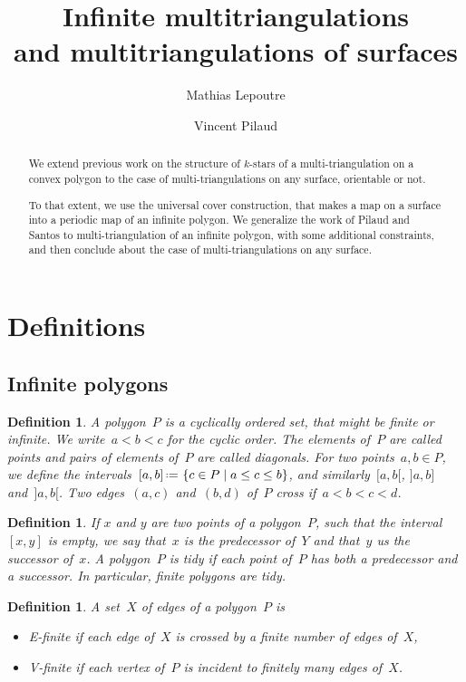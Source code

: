 \documentclass{amsart}
\title[Infinite multitriangulations and multitriangulations of surfaces]{Infinite multitriangulations \\ and multitriangulations of surfaces}
\author{Mathias Lepoutre}
\author{Vincent Pilaud}
\newtheorem{definition}[theorem]{Definition}
\theoremstyle{remark}
\newcommand{\darkblue}{\color{darkblue}} %
\newcommand{\defn}[1]{\textsl{\darkblue #1}} %
\newcommand*{\nbd}[0]{neighbourhood\xspace}
\newcommand*{\ef}[0]{E-finite\xspace}
\newcommand*{\vf}[0]{V-finite\xspace}
\newcommand{\set}[2]{\left\{ #1 \;\middle|\; #2 \right\}} %
\newcommand{\eqdef}{\mbox{\,\raisebox{0.2ex}{\scriptsize\ensuremath{\mathrm:}}\ensuremath{=}\,}} %
\begin{document}
\begin{abstract}
We extend previous work on the structure of $k$-stars of a multi-triangulation on a convex polygon to the case of multi-triangulations on any surface, orientable or not. 

To that extent, we use the universal cover construction, that makes a map on a surface into a periodic map of an infinite polygon. We generalize the work of Pilaud and Santos to multi-triangulation of an infinite polygon, with some additional constraints, and then conclude about the case of multi-triangulations on any surface.
\end{abstract}

\maketitle

\section{Definitions}

\subsection{Infinite polygons}

\begin{definition}%
A \defn{polygon}~$P$ is a cyclically ordered set, that might be finite or infinite.
We write~$a < b < c$ for the cyclic order.
The elements of~$P$ are called \defn{points} and pairs of elements of~$P$ are called \defn{diagonals}.
For two points~$a,b \in P$, we define the intervals~$[a,b] \eqdef \set{c \in P}{a \le c \le b}$, and similarly~$[a,b[$, $]a,b]$ and~$]a,b[$.
Two edges~$(a,c)$ and~$(b,d)$ of~$P$ \defn{cross} if~$a < b < c < d$.
\end{definition}

\begin{definition}%
If $x$ and $y$ are two points of a polygon~$P$, such that the interval~$[x,y]$ is empty, we say that~$x$ is the \defn{predecessor} of~$Y$ and that~$y$ us the \defn{successor} of~$x$. A polygon~$P$ is \defn{tidy} if each point of~$P$ has both a predecessor and a successor. In particular, finite polygons are tidy.
\end{definition}

\begin{definition}%
A set~$X$ of edges of a polygon~$P$ is 
\begin{itemize}
\item \defn{\ef} if each edge of~$X$ is crossed by a finite number of edges of~$X$,
\item \defn{\vf} if each vertex of~$P$ is incident to finitely many edges of~$X$.
\end{itemize}
\end{definition}
\end{document}
